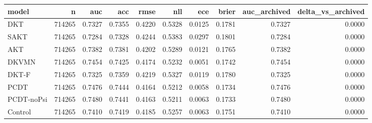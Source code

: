 \begin{tabular}{lrrrrrrrrr}
\toprule
model & n & auc & acc & rmse & nll & ece & brier & auc\_archived & delta\_vs\_archived \\
\midrule
DKT & 714265 & 0.7327 & 0.7355 & 0.4220 & 0.5328 & 0.0125 & 0.1781 & 0.7327 & 0.0000 \\
SAKT & 714265 & 0.7284 & 0.7328 & 0.4244 & 0.5383 & 0.0297 & 0.1801 & 0.7284 & 0.0000 \\
AKT & 714265 & 0.7382 & 0.7381 & 0.4202 & 0.5289 & 0.0121 & 0.1765 & 0.7382 & 0.0000 \\
DKVMN & 714265 & 0.7454 & 0.7425 & 0.4174 & 0.5232 & 0.0051 & 0.1742 & 0.7454 & 0.0000 \\
DKT-F & 714265 & 0.7325 & 0.7359 & 0.4219 & 0.5327 & 0.0119 & 0.1780 & 0.7325 & 0.0000 \\
PCDT & 714265 & 0.7476 & 0.7444 & 0.4164 & 0.5212 & 0.0058 & 0.1734 & 0.7476 & 0.0000 \\
PCDT-noPsi & 714265 & 0.7480 & 0.7441 & 0.4163 & 0.5211 & 0.0063 & 0.1733 & 0.7480 & 0.0000 \\
Control & 714265 & 0.7410 & 0.7419 & 0.4185 & 0.5257 & 0.0063 & 0.1751 & 0.7410 & 0.0000 \\
\bottomrule
\end{tabular}
